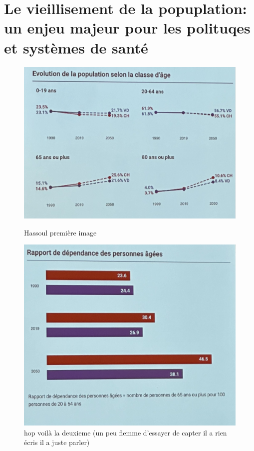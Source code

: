\documentclass[11pt]{article}
\begin{document}
\newpage
\section{Le vieillisement de la popuplation: un enjeu majeur pour les polituqes et systèmes de santé}
\begin{figure}[h!]
    \centering
    \begin{minipage}[b]{0.5\textwidth}
      \includegraphics[width=\textwidth]{images/14.jpg}
      \caption{Hassoul première image }
      \label{fig:image1}
    \end{minipage}
    \hfill

    \vspace*{10px}
    \begin{minipage}[b]{0.45\textwidth}
      \includegraphics[width=\textwidth]{images/14_2.jpg}
      \caption{hop voilà la deuxieme (un peu flemme d'essayer de capter il a rien écris il a juste parler)}
      \label{fig:image2}
    \end{minipage}
  \end{figure}
\end{document}
